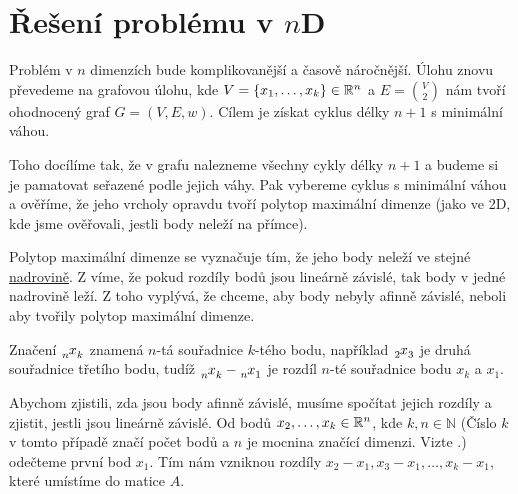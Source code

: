 \section{Řešení problému v \texorpdfstring{$n$D}{nD}}
\label{sec:reseni_1D}
Problém v $n$ dimenzích bude komplikovanější a časově náročnější. Úlohu znovu převedeme na grafovou úlohu, kde $V = \{x_1,\ldots, x_k\} \in \mathbb{R}^n$ a $E = \binom{V}{2}$ nám tvoří ohodnocený graf $G = (V, E, w)$. Cílem je získat cyklus délky $n+1$ s minimální váhou.

Toho docílíme tak, že v grafu nalezneme všechny cykly délky $n+1$ a budeme si je pamatovat seřazené podle jejich váhy. Pak vybereme cyklus s minimální váhou a ověříme, že jeho vrcholy opravdu tvoří polytop maximální dimenze (jako ve 2D, kde jsme ověřovali, jestli body neleží na přímce).

Polytop maximální dimenze se vyznačuje tím, že jeho body neleží ve stejné \hyperref[definice:nadrovina]{nadrovině}. Z  víme, že pokud rozdíly bodů jsou lineárně závislé, tak body v jedné nadrovině leží. Z toho vyplývá, že chceme, aby body nebyly afinně závislé, neboli aby tvořily polytop maximální dimenze.  

\begin{poznamka} 
  \label{poznamka:varovani_index}
  Značení $\x{n}{k}$ znamená $n$-tá souřadnice $k$-tého bodu, například $\x{2}{3}$ je dru\-há souřadnice třetího bodu, tudíž $\x{n}{k} - \x{n}{1}$ je rozdíl $n$-té souřadnice bodu $x_k$ a $x_1$. 
\end{poznamka}

Abychom zjistili, zda jsou body afinně závislé, musíme spočítat jejich rozdíly a zjistit, jestli jsou lineárně závislé. Od bodů $x_2, \ldots, x_k \in \mathbb{R}^n$, kde  $k, n \in \mathbb{N}$ (Číslo $k$ v tomto případě značí počet bodů a $n$ je mocnina značící dimenzi. Vizte .) odečteme první bod $x_1$. Tím nám vzniknou rozdíly $x_2-x_1, x_3-x_1, \dots, x_k-x_1$, které umístíme do matice $A$. 


